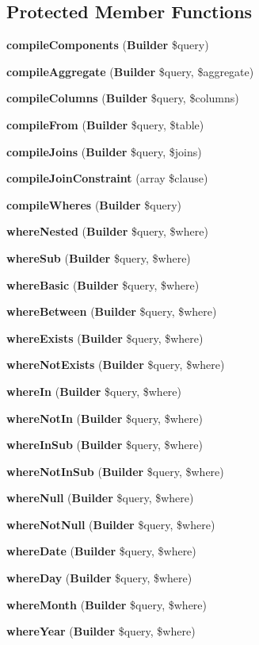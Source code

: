 \subsection*{Protected Member Functions}
\begin{DoxyCompactItemize}
\item 
{\bf compile\+Components} ({\bf Builder} \$query)
\item 
{\bf compile\+Aggregate} ({\bf Builder} \$query, \$aggregate)
\item 
{\bf compile\+Columns} ({\bf Builder} \$query, \$columns)
\item 
{\bf compile\+From} ({\bf Builder} \$query, \$table)
\item 
{\bf compile\+Joins} ({\bf Builder} \$query, \$joins)
\item 
{\bf compile\+Join\+Constraint} (array \$clause)
\item 
{\bf compile\+Wheres} ({\bf Builder} \$query)
\item 
{\bf where\+Nested} ({\bf Builder} \$query, \$where)
\item 
{\bf where\+Sub} ({\bf Builder} \$query, \$where)
\item 
{\bf where\+Basic} ({\bf Builder} \$query, \$where)
\item 
{\bf where\+Between} ({\bf Builder} \$query, \$where)
\item 
{\bf where\+Exists} ({\bf Builder} \$query, \$where)
\item 
{\bf where\+Not\+Exists} ({\bf Builder} \$query, \$where)
\item 
{\bf where\+In} ({\bf Builder} \$query, \$where)
\item 
{\bf where\+Not\+In} ({\bf Builder} \$query, \$where)
\item 
{\bf where\+In\+Sub} ({\bf Builder} \$query, \$where)
\item 
{\bf where\+Not\+In\+Sub} ({\bf Builder} \$query, \$where)
\item 
{\bf where\+Null} ({\bf Builder} \$query, \$where)
\item 
{\bf where\+Not\+Null} ({\bf Builder} \$query, \$where)
\item 
{\bf where\+Date} ({\bf Builder} \$query, \$where)
\item 
{\bf where\+Day} ({\bf Builder} \$query, \$where)
\item 
{\bf where\+Month} ({\bf Builder} \$query, \$where)
\item 
{\bf where\+Year} ({\bf Builder} \$query, \$where)
\item 

\end{DoxyCompactItemize}
